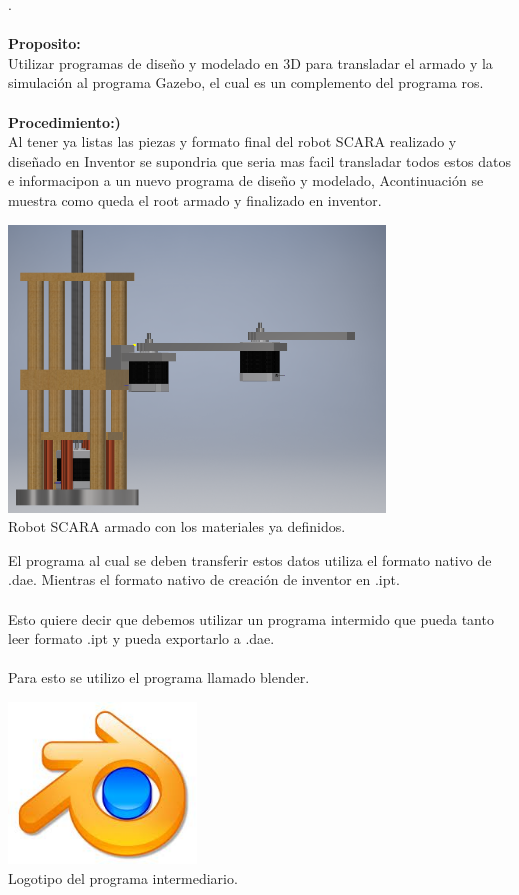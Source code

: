 \documentclass[12pt,a4paper]{article}
\begin{document}
. \\ \\ \textbf{Proposito:}\\
Utilizar programas de diseño y modelado en 3D para transladar el armado y la simulación al programa Gazebo, el cual es un complemento del programa ros.\\
\\
\textbf{Procedimiento:)}\\
Al tener ya listas las piezas y formato final del robot SCARA realizado y diseñado en Inventor se supondria que seria mas facil transladar todos estos datos e informacipon a un nuevo programa de diseño y modelado, Acontinuación se muestra como queda el root armado y finalizado en inventor.
\begin{center}
\includegraphics[width=10cm]{Imagenes/2.png}\\ Robot SCARA armado con los materiales ya definidos.
\end{center}
El programa al cual se deben transferir estos datos utiliza el formato nativo de .dae. Mientras el formato nativo de creación de inventor en .ipt.\\
\\
Esto quiere decir que debemos utilizar un programa intermido que pueda tanto leer formato .ipt y pueda exportarlo a .dae.\\
\\
Para esto se utilizo el programa llamado blender.\\
\begin{center}
\includegraphics[width=5cm]{Imagenes/B.jpeg}\\ Logotipo del programa intermediario.
\end{center}
\end{document}
